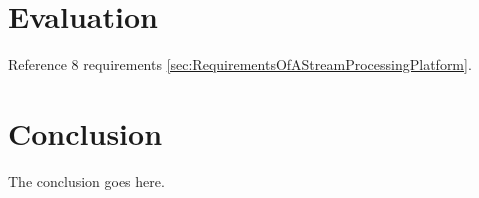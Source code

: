 \documentclass[conference]{IEEEtran}
\begin{document}
\cite{ElasticScalingStreamProcessing}
\cite{OnlyOneLook}
\cite{YARN}
\cite{ScalableDistributedStreamProcessing}



\section{Evaluation}
\label{sec:Evaluation}

\lipsum[2-4]


\cite{TwitterHeronBlog}

\cite{TwitterHeron}

Reference 8 requirements \ref{sec:RequirementsOfAStreamProcessingPlatform}.


\section{Conclusion}
\label{sec:Conclusion}

The conclusion goes here.

\lipsum[2-4]





\end{document}
